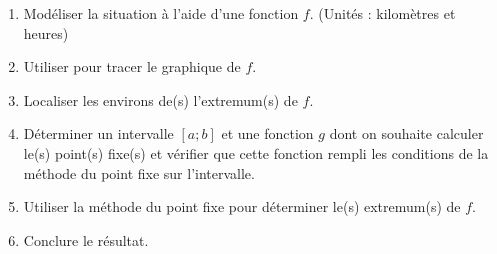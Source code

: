 \begin{boxexstheorieligne}
\begin{enumerate}[label=\textbf{E\thechapter.\arabic*},itemsep=8mm,resume=refexercices]
\begin{enumerate}[label=\roman*),itemsep=1mm]
\item Modéliser la situation à l'aide d'une fonction $f$. {\small(Unités : kilomètres et heures)}
\item Utiliser  pour tracer le graphique de $f$.
\item Localiser les environs de(s) l'extremum(s) de $f$.
\item Déterminer un intervalle $[a;b]$ et une fonction $g$ dont on souhaite calculer le(s) point(s) fixe(s) et vérifier que cette fonction rempli les conditions de la méthode du point fixe sur l'intervalle.
\item Utiliser la méthode du point fixe pour déterminer le(s) extremum(s) de $f$.%
\item Conclure le résultat.
\end{enumerate}

\end{enumerate}
\end{boxexstheorieligne}

